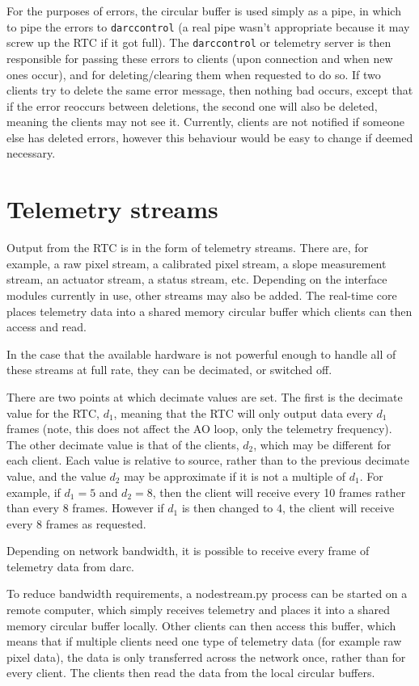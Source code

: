 \documentclass[a4,10pt]{article}
\begin{document}
For the purposes of errors, the circular buffer is used simply as a
pipe, in which to pipe the errors to {\tt darccontrol} (a real pipe wasn't
appropriate because it may screw up the RTC if it got full).  The
{\tt darccontrol} or telemetry server is then responsible for passing these
errors to clients (upon connection and when new ones occur), and for
deleting/clearing them when requested to do so.  If two clients try to
delete the same error message, then nothing bad occurs, except that if
the error reoccurs between deletions, the second one will also be
deleted, meaning the clients may not see it.  Currently, clients are
not notified if someone else has deleted errors, however this
behaviour would be easy to change if deemed necessary.

\section{Telemetry streams}
Output from the RTC is in the form of telemetry streams.  There are,
for example, a raw pixel stream, a calibrated pixel stream, a slope
measurement stream, an actuator stream, a status stream, etc.
Depending on the interface modules currently in use, other streams may
also be added.  The real-time core places telemetry data into a shared
memory circular buffer which clients can then access and read.

In the case that the available hardware is not powerful enough to
handle all of these streams at full rate, they can be decimated, or
switched off.

There are two points at which decimate values are set.  The first is
the decimate value for the RTC, $d_1$, meaning that the RTC will only
output data every $d_1$ frames (note, this does not affect the AO
loop, only the telemetry frequency).  The other decimate value is that
of the clients, $d_2$, which may be different for each client.  Each value is relative to source, rather than to the
previous decimate value, and the value $d_2$ may be
approximate if it is not a multiple of $d_1$.  For example, if $d_1=5$
and $d_2=8$, then the client will receive every 10 frames rather than
every 8 frames.  However if $d_1$ is then changed to 4, the client
will receive every 8 frames as requested.

Depending on network bandwidth, it is possible to receive every frame
of telemetry data from darc.

To reduce bandwidth requirements, a nodestream.py process can be
started on a remote computer, which simply receives telemetry and
places it into a shared memory circular buffer locally.  Other clients
can then access this buffer, which means that if multiple clients need
one type of telemetry data (for example raw pixel data), the data is
only transferred across the network once, rather than for every
client.  The clients then read the data from the local circular buffers.
\end{document}
